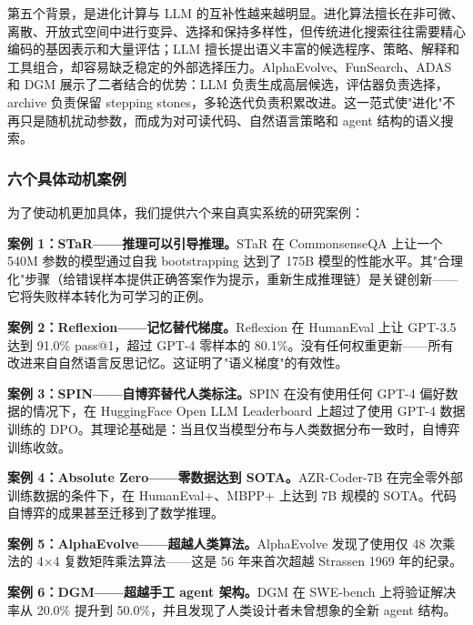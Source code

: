 第五个背景，是进化计算与 LLM 的互补性越来越明显。进化算法擅长在非可微、离散、开放式空间中进行变异、选择和保持多样性，但传统进化搜索往往需要精心编码的基因表示和大量评估；LLM 擅长提出语义丰富的候选程序、策略、解释和工具组合，却容易缺乏稳定的外部选择压力。AlphaEvolve、FunSearch、ADAS 和 DGM 展示了二者结合的优势：LLM 负责生成高层候选，评估器负责选择，archive 负责保留 stepping stones，多轮迭代负责积累改进。这一范式使"进化"不再只是随机扰动参数，而成为对可读代码、自然语言策略和 agent 结构的语义搜索。

\subsubsection{六个具体动机案例}

为了使动机更加具体，我们提供六个来自真实系统的研究案例：

\textbf{案例 1：STaR——推理可以引导推理。}STaR 在 CommonsenseQA 上让一个 540M 参数的模型通过自我 bootstrapping 达到了 175B 模型的性能水平。其"合理化"步骤（给错误样本提供正确答案作为提示，重新生成推理链）是关键创新——它将失败样本转化为可学习的正例。

\textbf{案例 2：Reflexion——记忆替代梯度。}Reflexion 在 HumanEval 上让 GPT-3.5 达到 91.0\% pass@1，超过 GPT-4 零样本的 80.1\%。没有任何权重更新——所有改进来自自然语言反思记忆。这证明了"语义梯度"的有效性。

\textbf{案例 3：SPIN——自博弈替代人类标注。}SPIN 在没有使用任何 GPT-4 偏好数据的情况下，在 HuggingFace Open LLM Leaderboard 上超过了使用 GPT-4 数据训练的 DPO。其理论基础是：当且仅当模型分布与人类数据分布一致时，自博弈训练收敛。

\textbf{案例 4：Absolute Zero——零数据达到 SOTA。}AZR-Coder-7B 在完全零外部训练数据的条件下，在 HumanEval+、MBPP+ 上达到 7B 规模的 SOTA。代码自博弈的成果甚至迁移到了数学推理。

\textbf{案例 5：AlphaEvolve——超越人类算法。}AlphaEvolve 发现了使用仅 48 次乘法的 4$\times$4 复数矩阵乘法算法——这是 56 年来首次超越 Strassen 1969 年的纪录。

\textbf{案例 6：DGM——超越手工 agent 架构。}DGM 在 SWE-bench 上将验证解决率从 20.0\% 提升到 50.0\%，并且发现了人类设计者未曾想象的全新 agent 结构。

